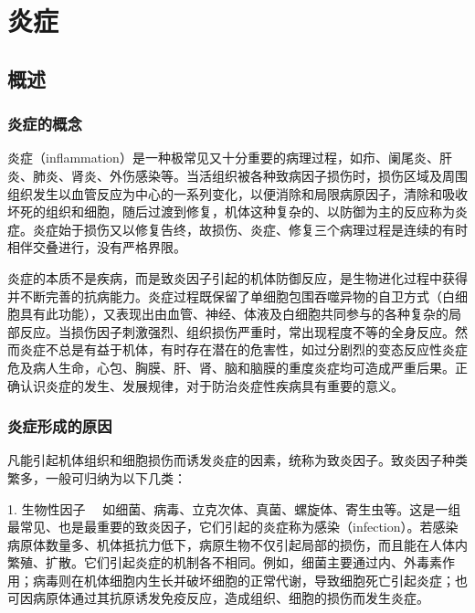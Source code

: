 \chapter{炎症}


\section{概述}

\subsection{炎症的概念}

炎症（inflammation）是一种极常见又十分重要的病理过程，如疖、阑尾炎、肝炎、肺炎、肾炎、外伤感染等。当活组织被各种致病因子损伤时，损伤区域及周围组织发生以血管反应为中心的一系列变化，以便消除和局限病原因子，清除和吸收坏死的组织和细胞，随后过渡到修复，机体这种复杂的、以防御为主的反应称为炎症。炎症始于损伤又以修复告终，故损伤、炎症、修复三个病理过程是连续的有时相伴交叠进行，没有严格界限。

炎症的本质不是疾病，而是致炎因子引起的机体防御反应，是生物进化过程中获得并不断完善的抗病能力。炎症过程既保留了单细胞包围吞噬异物的自卫方式（白细胞具有此功能），又表现出由血管、神经、体液及白细胞共同参与的各种复杂的局部反应。当损伤因子刺激强烈、组织损伤严重时，常出现程度不等的全身反应。然而炎症不总是有益于机体，有时存在潜在的危害性，如过分剧烈的变态反应性炎症危及病人生命，心包、胸膜、肝、肾、脑和脑膜的重度炎症均可造成严重后果。正确认识炎症的发生、发展规律，对于防治炎症性疾病具有重要的意义。

\subsection{炎症形成的原因}

凡能引起机体组织和细胞损伤而诱发炎症的因素，统称为致炎因子。致炎因子种类繁多，一般可归纳为以下几类：

{1. 生物性因子}
　如细菌、病毒、立克次体、真菌、螺旋体、寄生虫等。这是一组最常见、也是最重要的致炎因子，它们引起的炎症称为感染（infection）。若感染病原体数量多、机体抵抗力低下，病原生物不仅引起局部的损伤，而且能在人体内繁殖、扩散。它们引起炎症的机制各不相同。例如，细菌主要通过内、外毒素作用；病毒则在机体细胞内生长并破坏细胞的正常代谢，导致细胞死亡引起炎症；也可因病原体通过其抗原诱发免疫反应，造成组织、细胞的损伤而发生炎症。

